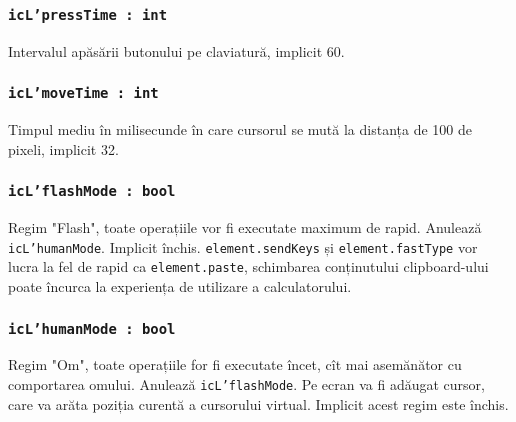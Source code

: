 \subsubsection{\texttt{icL'pressTime : int}}

Intervalul apăsării butonului pe claviatură, implicit 60.

\subsubsection{\texttt{icL'moveTime : int}}

Timpul mediu în milisecunde în care cursorul se mută la distanța de 100 de pixeli, implicit 32.

\subsubsection{\texttt{icL'flashMode : bool}}

Regim "Flash", toate operațiile vor fi executate maximum de rapid. Anulează \texttt{icL'humanMode}. Implicit închis. \texttt{element.sendKeys} și \texttt{element.fastType} vor lucra la fel de rapid ca \texttt{element.paste}, schimbarea conținutului clipboard-ului poate încurca la experiența de utilizare a calculatorului.

\subsubsection{\texttt{icL'humanMode : bool}}

Regim "Om", toate operațiile for fi executate încet, cît mai asemănător cu comportarea omului. Anulează \texttt{icL'flashMode}. Pe ecran va fi adăugat cursor, care va arăta poziția curentă a cursorului virtual. Implicit acest regim este închis.

